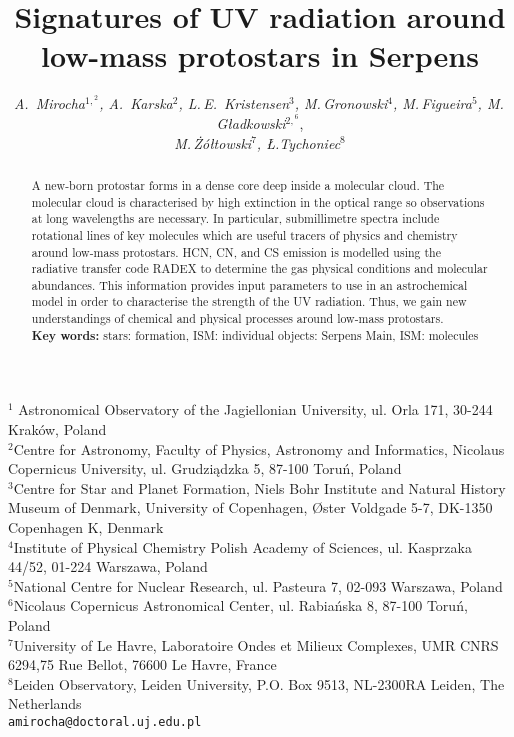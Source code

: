 \documentclass[a4paper]{article}
\begin{document}
\fontsize{11}{11}\selectfont %
\title{Signatures of UV radiation around low-mass protostars in Serpens}
\author{\textsl{A.~Mirocha$^{1,}^{2}$, A.~Karska$^{2}$, L.\,E.~Kristensen$^{3}$, M.\,Gronowski$^{4}$, M.\,Figueira$^{5}$, M.\, Gładkowski$^{2,}^{6}$}, \\  \textsl{M.\,Żółtowski$^{7}$, Ł.Tychoniec$^{8}$}}
\date{\vspace*{-6ex}}
\maketitle
\begin{center} {\small $^{1}$ Astronomical Observatory of the Jagiellonian University, ul. Orla 171, 30-244 Kraków, Poland\\
$^{2}$Centre for Astronomy, Faculty of Physics, Astronomy and Informatics, Nicolaus Copernicus University, ul. Grudziądzka 5, 87-100 Toruń, Poland\\
$^{3}$Centre for Star and Planet Formation, Niels Bohr Institute and Natural History Museum of Denmark, University of Copenhagen, Øster Voldgade 5-7, DK-1350 Copenhagen K, Denmark\\
$^{4}$Institute of Physical Chemistry Polish Academy of Sciences, ul. Kasprzaka 44/52, 01-224 Warszawa, Poland\\
$^{5}$National Centre for Nuclear Research, ul. Pasteura 7, 02-093 Warszawa, Poland\\
$^{6}$Nicolaus Copernicus Astronomical Center, ul. Rabiańska 8, 87-100 Toruń, Poland\\
$^{7}$University of Le Havre, Laboratoire Ondes et Milieux Complexes, UMR CNRS 6294,75 Rue Bellot, 76600 Le Havre, France\\
$^{8}$Leiden Observatory, Leiden University, P.O. Box 9513, NL-2300RA Leiden, The Netherlands\\
{\tt amirocha@doctoral.uj.edu.pl}}
\end{center}

\begin{abstract}
A new-born protostar forms in a dense core deep inside a molecular cloud. The molecular cloud is characterised by high extinction in the optical range so observations at long wavelengths are necessary. In particular, submillimetre spectra include rotational lines of key molecules which are useful tracers of physics and chemistry around low-mass protostars. HCN, CN, and CS emission is modelled using the radiative transfer code RADEX to determine the gas physical conditions and molecular abundances. This information provides input parameters to use in an astrochemical model in order to characterise the strength of the UV radiation. Thus, we gain new understandings of chemical and physical processes around low-mass protostars.\\[1ex]
{\bf Key words:} stars: formation, ISM: individual objects: Serpens Main, ISM: molecules
\end{abstract}
\end{document}
